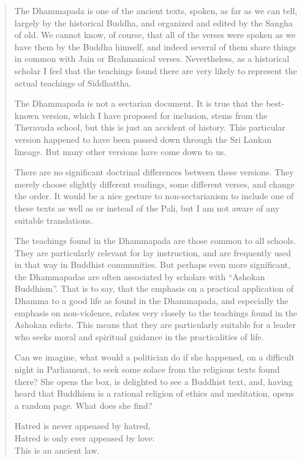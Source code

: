 \documentclass[12pt,openany]{book}%
\begin{document}
\begin{quotation}%
The Dhammapada is one of the ancient texts, spoken, as far as we can tell, largely by the historical Buddha, and organized and edited by the Sangha of old. We cannot know, of course, that all of the verses were spoken as we have them by the Buddha himself, and indeed several of them share things in common with Jain or Brahmanical verses. Nevertheless, as a historical scholar I feel that the teachings found there are very likely to represent the actual teachings of Siddhattha.

The Dhammapada is not a sectarian document. It is true that the best-known version, which I have proposed for inclusion, stems from the Theravada school, but this is just an accident of history. This particular version happened to have been passed down through the Sri Lankan lineage. But many other versions have come down to us.

There are no significant doctrinal differences between these versions. They merely choose slightly different readings, some different verses, and change the order. It would be a nice gesture to non-sectarianism to include one of these texts as well as or instead of the Pali, but I am not aware of any suitable translations.

The teachings found in the Dhammapada are those common to all schools. They are particularly relevant for lay instruction, and are frequently used in that way in Buddhist communities. But perhaps even more significant, the Dhammapadas are often associated by scholars with “Ashokan Buddhism”. That is to say, that the emphasis on a practical application of Dhamma to a good life as found in the Dhammapada, and especially the emphasis on non-violence, relates very closely to the teachings found in the Ashokan edicts. This means that they are particularly suitable for a leader who seeks moral and spiritual guidance in the practicalities of life.

Can we imagine, what would a politician do if she happened, on a difficult night in Parliament, to seek some solace from the religious texts found there? She opens the box, is delighted to see a Buddhist text, and, having heard that Buddhism is a rational religion of ethics and meditation, opens a random page. What does she find?

Hatred is never appeased by hatred,\\

Hatred is only ever appeased by love:\\

This is an ancient law.

%
\end{quotation}
\end{document}
